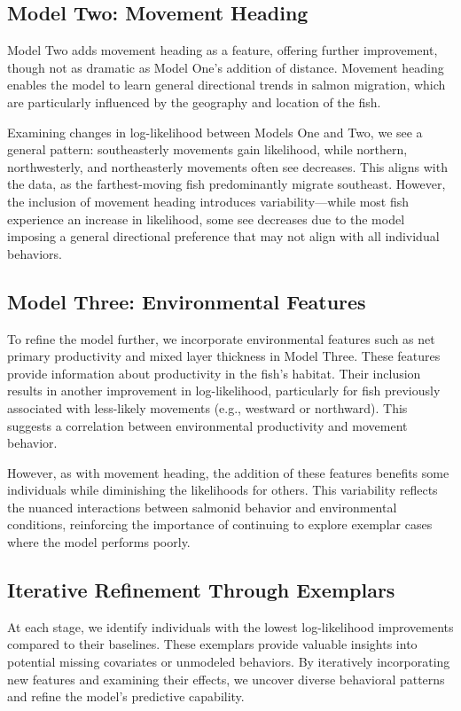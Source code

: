 \documentclass[11pt]{article}
\begin{document}
\subsection*{Model Two: Movement Heading}
Model Two adds movement heading as a feature, offering further improvement, though not as dramatic as Model One's addition of distance. Movement heading enables the model to learn general directional trends in salmon migration, which are particularly influenced by the geography and location of the fish.

Examining changes in log-likelihood between Models One and Two, we see a general pattern: southeasterly movements gain likelihood, while northern, northwesterly, and northeasterly movements often see decreases. This aligns with the data, as the farthest-moving fish predominantly migrate southeast. However, the inclusion of movement heading introduces variability—while most fish experience an increase in likelihood, some see decreases due to the model imposing a general directional preference that may not align with all individual behaviors.

\subsection*{Model Three: Environmental Features}
To refine the model further, we incorporate environmental features such as net primary productivity and mixed layer thickness in Model Three. These features provide information about productivity in the fish's habitat. Their inclusion results in another improvement in log-likelihood, particularly for fish previously associated with less-likely movements (e.g., westward or northward). This suggests a correlation between environmental productivity and movement behavior.

However, as with movement heading, the addition of these features benefits some individuals while diminishing the likelihoods for others. This variability reflects the nuanced interactions between salmonid behavior and environmental conditions, reinforcing the importance of continuing to explore exemplar cases where the model performs poorly.

\subsection*{Iterative Refinement Through Exemplars}
At each stage, we identify individuals with the lowest log-likelihood improvements compared to their baselines. These exemplars provide valuable insights into potential missing covariates or unmodeled behaviors. By iteratively incorporating new features and examining their effects, we uncover diverse behavioral patterns and refine the model's predictive capability.
\end{document}
